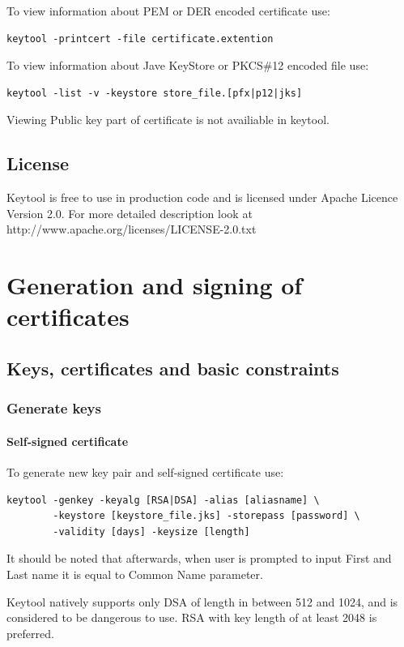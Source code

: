 \documentclass[10pt, a4paper]{report}
\begin{document}
To view information about PEM or DER encoded certificate use:
\begin{verbatim}
keytool -printcert -file certificate.extention
\end{verbatim}

To view information about Jave KeyStore or PKCS\#12 encoded file use:
\begin{verbatim}
keytool -list -v -keystore store_file.[pfx|p12|jks]
\end{verbatim}

Viewing Public key part of certificate is not availiable in keytool.

  \subsection{License}
Keytool is free to use in production code and is licensed under Apache Licence Version 2.0. For more detailed description look at http://www.apache.org/licenses/LICENSE-2.0.txt
  
\section{Generation and signing of certificates}

  \subsection{Keys, certificates and basic constraints}
  
    \subsubsection{Generate keys}
    
      \paragraph{Self-signed certificate}
To generate new key pair and self-signed certificate use:
\begin{verbatim}
keytool -genkey -keyalg [RSA|DSA] -alias [aliasname] \
        -keystore [keystore_file.jks] -storepass [password] \
        -validity [days] -keysize [length]
\end{verbatim}

It should be noted that afterwards, when user is prompted to input First and Last name it is equal to Common Name parameter.

Keytool natively supports only DSA of length in between 512 and 1024, and is considered to be dangerous to use. RSA with key length of at least 2048 is preferred.
\end{document}
